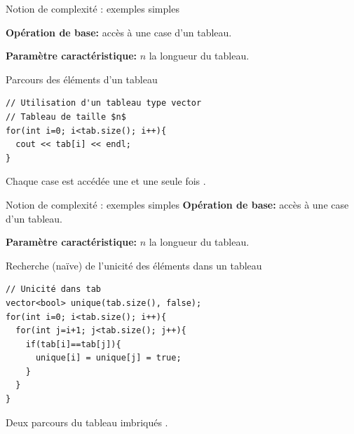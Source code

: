 \begin{frame}[fragile]{Notion de complexité : exemples simples}

\textbf{Opération de base:} accès à une case d'un tableau.

\textbf{Paramètre caractéristique:} $n$ la longueur du tableau.

\begin{exampleblock}{Parcours des éléments d'un tableau}
\begin{verbatim}
// Utilisation d'un tableau type vector
// Tableau de taille $n$
for(int i=0; i<tab.size(); i++){
  cout << tab[i] << endl;
}
\end{verbatim}
Chaque case est accédée une et une seule fois .
\end{exampleblock}
\end{frame}

\begin{frame}[fragile]{Notion de complexité : exemples simples}
\textbf{Opération de base:} accès à une case d'un tableau.

\textbf{Paramètre caractéristique:} $n$ la longueur du tableau.

\begin{exampleblock}{Recherche (naïve) de l'unicité des éléments dans un tableau}
\begin{verbatim}
// Unicité dans tab
vector<bool> unique(tab.size(), false);
for(int i=0; i<tab.size(); i++){
  for(int j=i+1; j<tab.size(); j++){
    if(tab[i]==tab[j]){
      unique[i] = unique[j] = true;
    }
  }
}
\end{verbatim}
Deux parcours du tableau imbriqués .
\end{exampleblock}
\end{frame}

